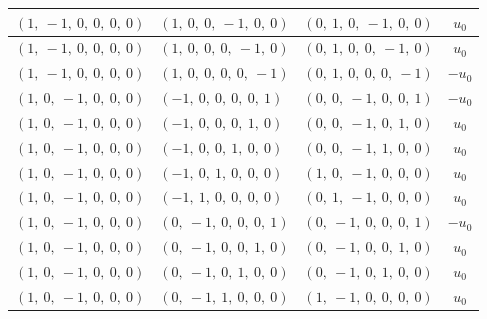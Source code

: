 \documentclass[11pt]{article}
\theoremstyle{definition}
\begin{document}
\begin{longtable}{|l|l|l|c|}
    \hline
    $\left( 1, \  -1, \  0, \  0, \  0, \  0\right)$ & $\left( 1, \  0, \  0, \  -1, \  0, \  0\right)$ & $\left( 0, \  1, \  0, \  -1, \  0, \  0\right)$ & $u_{0}$ \\
    \hline
    $\left( 1, \  -1, \  0, \  0, \  0, \  0\right)$ & $\left( 1, \  0, \  0, \  0, \  -1, \  0\right)$ & $\left( 0, \  1, \  0, \  0, \  -1, \  0\right)$ & $u_{0}$ \\
    \hline
    $\left( 1, \  -1, \  0, \  0, \  0, \  0\right)$ & $\left( 1, \  0, \  0, \  0, \  0, \  -1\right)$ & $\left( 0, \  1, \  0, \  0, \  0, \  -1\right)$ & $- u_{0}$ \\
    \hline
    $\left( 1, \  0, \  -1, \  0, \  0, \  0\right)$ & $\left( -1, \  0, \  0, \  0, \  0, \  1\right)$ & $\left( 0, \  0, \  -1, \  0, \  0, \  1\right)$ & $- u_{0}$ \\
    \hline
    $\left( 1, \  0, \  -1, \  0, \  0, \  0\right)$ & $\left( -1, \  0, \  0, \  0, \  1, \  0\right)$ & $\left( 0, \  0, \  -1, \  0, \  1, \  0\right)$ & $u_{0}$ \\
    \hline
    $\left( 1, \  0, \  -1, \  0, \  0, \  0\right)$ & $\left( -1, \  0, \  0, \  1, \  0, \  0\right)$ & $\left( 0, \  0, \  -1, \  1, \  0, \  0\right)$ & $u_{0}$ \\
    \hline
    $\left( 1, \  0, \  -1, \  0, \  0, \  0\right)$ & $\left( -1, \  0, \  1, \  0, \  0, \  0\right)$ & $\left( 1, \  0, \  -1, \  0, \  0, \  0\right)$ & $u_{0}$ \\
    \hline
    $\left( 1, \  0, \  -1, \  0, \  0, \  0\right)$ & $\left( -1, \  1, \  0, \  0, \  0, \  0\right)$ & $\left( 0, \  1, \  -1, \  0, \  0, \  0\right)$ & $u_{0}$ \\
    \hline
    $\left( 1, \  0, \  -1, \  0, \  0, \  0\right)$ & $\left( 0, \  -1, \  0, \  0, \  0, \  1\right)$ & $\left( 0, \  -1, \  0, \  0, \  0, \  1\right)$ & $- u_{0}$ \\
    \hline
    $\left( 1, \  0, \  -1, \  0, \  0, \  0\right)$ & $\left( 0, \  -1, \  0, \  0, \  1, \  0\right)$ & $\left( 0, \  -1, \  0, \  0, \  1, \  0\right)$ & $u_{0}$ \\
    \hline
    $\left( 1, \  0, \  -1, \  0, \  0, \  0\right)$ & $\left( 0, \  -1, \  0, \  1, \  0, \  0\right)$ & $\left( 0, \  -1, \  0, \  1, \  0, \  0\right)$ & $u_{0}$ \\
    \hline
    $\left( 1, \  0, \  -1, \  0, \  0, \  0\right)$ & $\left( 0, \  -1, \  1, \  0, \  0, \  0\right)$ & $\left( 1, \  -1, \  0, \  0, \  0, \  0\right)$ & $u_{0}$ \\

\end{longtable}
\end{document}

